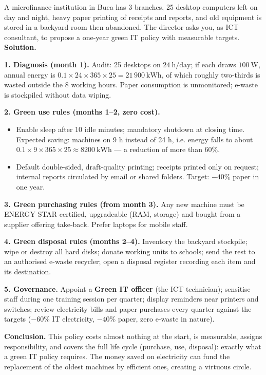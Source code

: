 \documentclass[11pt]{article}
\begin{document}
\begin{exoresolu}
A microfinance institution in Buea has 3 branches, 25 desktop computers left on day and night, heavy paper printing of receipts and reports, and old equipment is stored in a backyard room then abandoned. The director asks you, as ICT consultant, to propose a one-year green IT policy with measurable targets.
\tcblower
\textbf{Solution.}\par
\textbf{1. Diagnosis (month 1).} Audit: 25 desktops on $24\ \mathrm{h/day}$; if each draws $100\ \mathrm{W}$, annual energy is $0.1 \times 24 \times 365 \times 25 = 21\,900\ \mathrm{kWh}$, of which roughly two-thirds is wasted outside the 8 working hours. Paper consumption is unmonitored; e-waste is stockpiled without data wiping.\par
\textbf{2. Green use rules (months 1--2, zero cost).}
\begin{itemize}
\item Enable sleep after 10 idle minutes; mandatory shutdown at closing time. Expected saving: machines on 9 h instead of 24 h, i.e. energy falls to about $0.1 \times 9 \times 365 \times 25 \approx 8200\ \mathrm{kWh}$ — a reduction of more than $60\%$.
\item Default double-sided, draft-quality printing; receipts printed only on request; internal reports circulated by email or shared folders. Target: $-40\%$ paper in one year.
\end{itemize}
\textbf{3. Green purchasing rules (from month 3).} Any new machine must be ENERGY STAR certified, upgradeable (RAM, storage) and bought from a supplier offering take-back. Prefer laptops for mobile staff.\par
\textbf{4. Green disposal rules (months 2--4).} Inventory the backyard stockpile; wipe or destroy all hard disks; donate working units to schools; send the rest to an authorised e-waste recycler; open a disposal register recording each item and its destination.\par
\textbf{5. Governance.} Appoint a \textbf{Green IT officer} (the ICT technician); sensitise staff during one training session per quarter; display reminders near printers and switches; review electricity bills and paper purchases every quarter against the targets ($-60\%$ IT electricity, $-40\%$ paper, zero e-waste in nature).\par
\textbf{Conclusion.} This policy costs almost nothing at the start, is measurable, assigns responsibility, and covers the full life cycle (purchase, use, disposal): exactly what a green IT policy requires. The money saved on electricity can fund the replacement of the oldest machines by efficient ones, creating a virtuous circle.
\end{exoresolu}
\end{document}
